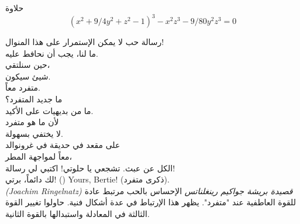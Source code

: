 \begin{surferPage}{حلاوة}
\[(x^2+ 9/4y^2	+ z^2- 1)^3- x^2z^3	- 9/80y^2z^3	= 0\]

\singlespacing
رسالة حب
\singlespacing
لا يمكن الإستمرار على هذا المنوال!\\
ما لنا، يجب أن نحافط عليه.\\
حين سنلتقي،\\
شيئ سيكون.\\
متفرد معاً. \\
ما جديد المتفرد؟\\
ما من بديهيات على الأكيد.\\
لأن ما هو متفرد\\
لا يختفي بسهولة.\\
على مقعد في حديقة في غرونوالد\\
معاً لمواجهة المطر،\\
الكل عن عبث. تشجعي يا حلوتي! اكتبي لي رسالة!\\
لك دائماً، برتي! ()
Yours, Bertie! (ذكرى متفرد).\\
\textit{(Joachim Ringelnatz) قصيدة بريشة جواكيم رينغلناتس}
\singlespacing 
الإحساس بالحب مرتبط عادة للقوة العاطفية عند "متفرد". يظهر هذا الإرتباط في عدة أشكال فنية.
\singlespacing 
حاولوا تغيير القوة الثالثة في المعادلة واستبدالها بالقوة الثانية.
\end{surferPage}
